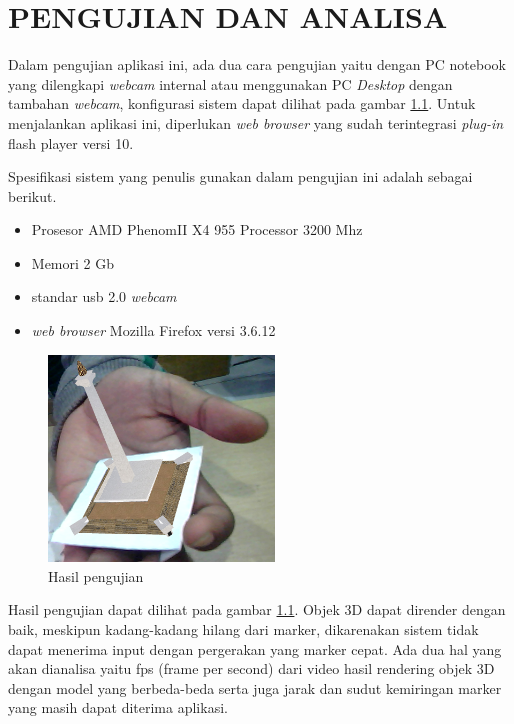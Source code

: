 \chapter{PENGUJIAN DAN ANALISA}
\label{chap:pengujian}
Dalam pengujian aplikasi ini, ada dua cara pengujian yaitu dengan PC notebook yang dilengkapi \textit{webcam} internal atau menggunakan PC \textit{Desktop} dengan tambahan \textit{webcam}, konfigurasi sistem dapat dilihat pada gambar \ref{fig:monas_ar}. Untuk menjalankan aplikasi ini, diperlukan \textit{web browser} yang sudah terintegrasi \textit{plug-in} flash player versi 10. 

Spesifikasi sistem yang penulis gunakan dalam pengujian ini adalah sebagai berikut.
\begin{itemize}
\item Prosesor AMD Phenom\texttrademark II X4 955 Processor 3200 Mhz
\item Memori 2 Gb
\item standar usb 2.0 \textit{webcam} 
\item \textit{web browser} Mozilla Firefox versi 3.6.12
\end{itemize}

\begin{figure}[h]
\begin{center}
\includegraphics[width=6cm]{./images/ar3dv/monas_ar}
\caption{\label{fig:monas_ar} Hasil pengujian}
\end{center}
\end{figure}

Hasil pengujian dapat dilihat pada gambar \ref{fig:monas_ar}. Objek 3D dapat dirender dengan baik, meskipun kadang-kadang hilang dari marker, dikarenakan sistem tidak dapat menerima input dengan pergerakan yang marker cepat. Ada dua hal yang akan dianalisa yaitu fps (frame per second) dari video hasil rendering objek 3D dengan model yang berbeda-beda serta juga jarak dan sudut kemiringan marker yang masih dapat diterima aplikasi.

